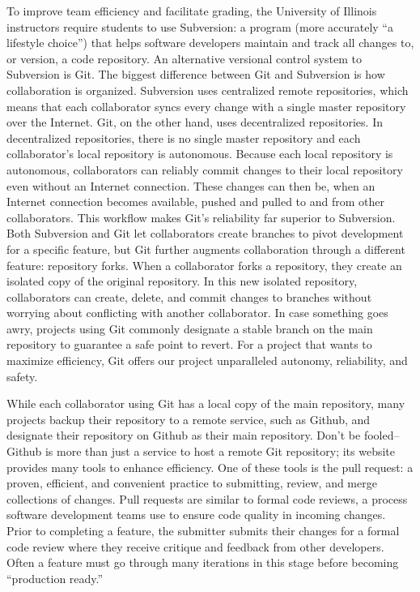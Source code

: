 To improve team efficiency and facilitate grading, the University of Illinois instructors require students to use Subversion: a program (more accurately “a lifestyle choice”) that helps software developers maintain and track all changes to, or version, a code repository. An alternative versional control system to Subversion is Git. The biggest difference between Git and Subversion is how collaboration is organized. Subversion uses centralized remote repositories, which means that each collaborator syncs every change with a single master repository over the Internet. Git, on the other hand, uses decentralized repositories. In decentralized repositories, there is no single master repository and each collaborator’s local repository is autonomous. Because each local repository is autonomous, collaborators can reliably commit changes to their local repository even without an Internet connection. These changes can then be, when an Internet connection becomes available, pushed and pulled to and from other collaborators. This workflow makes Git’s reliability far superior to Subversion. Both Subversion and Git let collaborators create branches to pivot development for a specific feature, but Git further augments collaboration through a different feature: repository forks. When a collaborator forks a repository, they create an isolated copy of the original repository. In this new isolated repository, collaborators can create, delete, and commit changes to branches without worrying about conflicting with another collaborator. In case something goes awry, projects using Git commonly designate a stable branch on the main repository to guarantee a safe point to revert. For a project that wants to maximize efficiency, Git offers our project unparalleled autonomy, reliability, and safety.

While each collaborator using Git has a local copy of the main repository, many projects backup their repository to a remote service, such as Github, and designate their repository on Github as their main repository. Don’t be fooled–Github is more than just a service to host a remote Git repository; its website provides many tools to enhance efficiency.  One of these tools is the pull request: a proven, efficient, and convenient practice to submitting, review, and merge collections of changes. Pull requests are similar to formal code reviews, a process software development teams use to ensure code quality in incoming changes. Prior to completing a feature, the submitter submits their changes for a formal code review where they receive critique and feedback from other developers. Often a feature must go through many iterations in this stage before becoming “production ready.”

